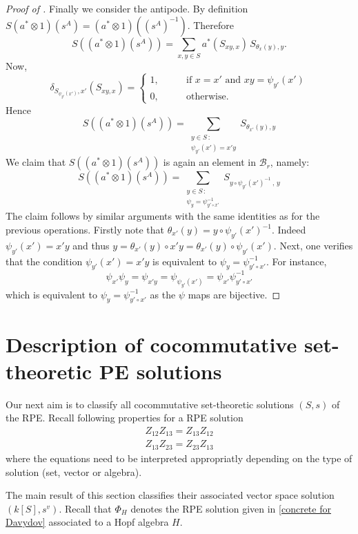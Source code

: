 \documentclass[a4paper,10pt]{amsart}
\theoremstyle{definition}
\theoremstyle{remark}
\newcommand\mc{\mathcal}
\begin{document}
\begin{proof}[Proof of ]
 Finally we consider the antipode. By definition  $S(a^{\ast}\otimes 1)(s^{A}) = (a^{\ast}\otimes 1)((s^{A})^{-1}).$
Therefore
 $$S((a^{\ast}\otimes 1)(s^{A})) = \sum_{x,y\in S}a^{\ast}(S_{xy,x})\,  S_{\theta_x(y),y}.$$
 Now, 
 $$\delta_{S_{\psi_{y'}(x')}, x'}(S_{xy,x})
 =\begin{cases}
     1, \qquad &\text{if } x=x'\text{ and } xy=\psi_{y'}(x')\\    
     0, &\text{otherwise}.
 \end{cases}$$
 Hence
 $$S((a^{\ast}\otimes 1)(s^{A})) = \sum_{\substack{y \in S\, : \,\\  \psi_{y'}(x') = x'y}} S_{\theta_{x'}(y),y}$$
We claim that $S((a^{\ast}\otimes 1)(s^{A}))$ is again an element in $\mc{B}_r$, namely:
\begin{equation}\label{antipode positive}
    S((a^{\ast}\otimes 1)(s^{A})) = \sum_{\substack{y \in S\,:  \, \\  \psi_y = \psi_{y'\circ x'}^{-1}}} S_{y \circ \psi_{y'}(x')^{-1}\ , \,y}
\end{equation}
The claim follows by similar arguments with the same identities as for the previous operations. Firstly note that $\theta_{x'}(y) = y\circ \psi_{y'}(x')^{-1}$. Indeed $\psi_{y'}(x') = x'y$ and thus $y = \theta_{x'}(y) \circ x'y = \theta_{x'}(y) \circ \psi_{y'}(x').$ Next, one verifies that the condition $\psi_{y'}(x') = x'y$ is equivalent to $\psi_y = \psi_{y'\circ x'}^{-1}$. For instance, 
$$\psi_{x'}\psi_y = \psi_{x'y} = \psi_{\psi_{y'}(x')} = \psi_{x'}\psi_{y' \circ x'}^{-1}$$
which is equivalent to $\psi_y = \psi_{y'\circ x'}^{-1}$ as the $\psi$ maps are bijective.
\end{proof}



\section{Description of cocommutative set-theoretic PE solutions}\label{cocomm classif section}
Our next aim is to classify all cocommutative set-theoretic solutions $(S,s)$ of the RPE. Recall following properties for a RPE solution
\begin{align}
Z_{12}Z_{13}=Z_{13}Z_{12} \tag{cocommutative}\\
Z_{13}Z_{23}=Z_{23}Z_{13} \tag{commutative}
\end{align}
where the equations need to be interpreted appropriatly depending on the type of solution (set, vector or algebra). 

The main result of this section classifies their associated vector space solution $(k[S],s^v)$. Recall that $\Phi_H$ denotes the RPE solution given in \eqref{concrete for Davydov} associated to a Hopf algebra $H$. 
\end{document}
